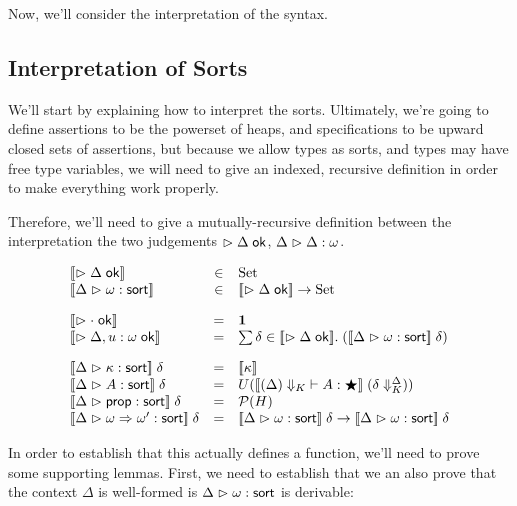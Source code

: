 Now, we'll consider the interpretation of the syntax. 

\subsection{Interpretation of Sorts}

We'll start by explaining how to interpret the sorts. Ultimately,
we're going to define assertions to be the powerset of heaps, and
specifications to be upward closed sets of assertions, but because we
allow types as sorts, and types may have free type variables, we will
need to give an indexed, recursive definition in order to make
everything work properly.

Therefore, we'll need to give a mutually-recursive definition between
the interpretation the two judgements $\vartriangleright {\Delta} \;\mathsf{ok}$,
${\Delta} \vartriangleright {\Delta} : {\omega}$.

\begin{displaymath}
  \begin{array}{lcl}
    \interp{\judgeACtx{\Delta}} & \in & \mbox{Set} \\
    \interp{\judgeSort{\omega}} & \in & \interp{\judgeACtx{\Delta}} \to \mbox{Set} \\[1em]

    \interp{\judgeACtx{\cdot}} & = & \unittype \\
    \interp{\judgeACtx{\Delta, u:\omega}} & = & \sum \delta \in \interp{\judgeACtx{\Delta}}.\; 
                                                  (\interp{\judgeSort{\omega}}\;\delta) \\[1em]
 
    \interp{\judgeSort{\kappa}}\;\delta & = & \interp{\kappa} \\
    \interp{\judgeSort{A}}\;\delta & = & 
       U(\interp{\judgeWK[\restrictkind{\Delta}]{A}{\bigstar}}\;(\restricttyenv{\Delta}{\delta})) \\
    \interp{\judgeSort{\assert}}\;\delta & = & \powerset{H} \\
    \interp{\judgeSort{\omega \To \omega'}}\;\delta & = &  
       \interp{\judgeSort{\omega}}\;\delta \to \interp{\judgeSort{\omega}}\;\delta \\
  \end{array}
\end{displaymath}

In order to establish that this actually defines a function, we'll
need to prove some supporting lemmas. First, we need to establish that
we an also prove that the context $\Delta$ is well-formed is
${{\Delta}} \vartriangleright {{\omega}} : {\mathsf{sort}}$ is derivable:

